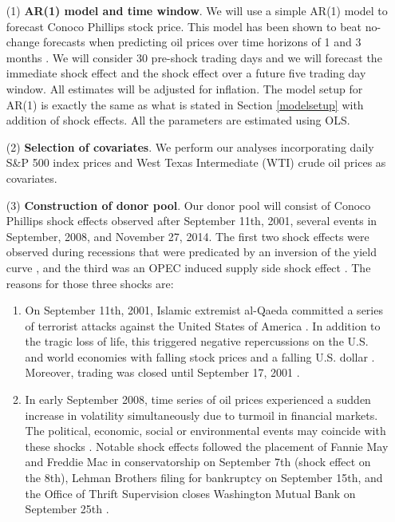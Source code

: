 \documentclass[11pt]{article}
\theoremstyle{definition}
\begin{document}
\begin{enumerate}
\item[(1)] {\bf AR(1) model and time window}. We will use a simple AR(1) model to forecast Conoco Phillips stock price. This model has been shown to beat no-change forecasts when predicting oil prices over time horizons of 1 and 3 months \citep{alquist2013forecasting}. We will consider 30 pre-shock trading days and we will forecast the immediate shock effect and the shock effect over a future five trading day window. All estimates will be adjusted for inflation. The model setup for AR(1) is exactly the same as what is stated in Section \ref{modelsetup} with addition of shock effects. All the parameters are estimated using OLS.
\item[(2)] {\bf Selection of covariates}. We perform our analyses incorporating daily S\&P 500 index prices and West Texas Intermediate (WTI) crude oil prices as covariates. 
\item[(3)] {\bf Construction of donor pool}. Our donor pool will consist of Conoco Phillips shock effects observed after September 11th, 2001, %
several events in September, 2008, and November 27, 2014. The first two shock effects were observed during recessions that were predicated by an inversion of the yield curve \citep{bauer2018economic}, and the third was an OPEC induced supply side shock effect \citep{huppmann2015opec}. The reasons for those three shocks are:
  \begin{enumerate}
  \item On September 11th, 2001, Islamic extremist al-Qaeda committed a series of terrorist attacks against the United States of America \citep{braniff2011towards}. In addition to the tragic loss of life, this triggered negative repercussions on the U.S. and world economies with falling stock prices and a falling U.S. dollar \citep{floyd2001terror}. Moreover, trading was closed until September 17, 2001 \citep{johnston2006impact}.
  \item  In early September 2008, time series of oil prices experienced a sudden increase in volatility simultaneously due to turmoil in financial markets. The political, economic, social or environmental events may coincide with these shocks \citep{ewing2013volatility}. Notable shock effects followed the placement of Fannie May and Freddie Mac in conservatorship on September 7th (shock effect on the 8th), Lehman Brothers filing for bankruptcy on September 15th, and the Office of Thrift Supervision closes Washington Mutual Bank on September 25th \citep{dwyer2009financial, longstaff2010subprime}.

\end{enumerate}
\end{enumerate}
\end{document}
